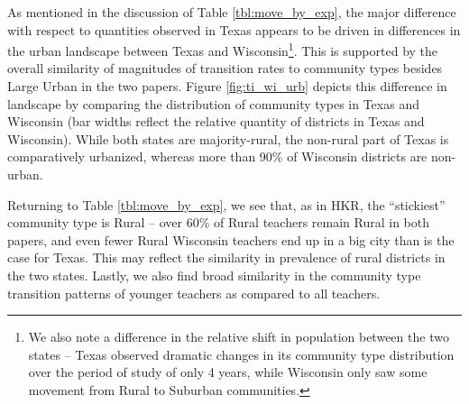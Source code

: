 \documentclass[12pt,]{article}
\let\rmarkdownfootnote\footnote%
\def\footnote{\protect\rmarkdownfootnote}
\begin{document}
As mentioned in the discussion of Table \ref{tbl:move_by_exp}, the major
difference with respect to quantities observed in Texas appears to be
driven in differences in the urban landscape between Texas and
Wisconsin\footnote{We also note a difference in the relative shift in
  population between the two states -- Texas observed dramatic changes
  in its community type distribution over the period of study of only 4
  years, while Wisconsin only saw some movement from Rural to Suburban
  communities.}. This is supported by the overall similarity of
magnitudes of transition rates to community types besides Large Urban in
the two papers. Figure \ref{fig:ti_wi_urb} depicts this difference in
landscape by comparing the distribution of community types in Texas and
Wisconsin (bar widths reflect the relative quantity of districts in
Texas and Wisconsin). While both states are majority-rural, the
non-rural part of Texas is comparatively urbanized, whereas more than
90\% of Wisconsin districts are non-urban.

Returning to Table \ref{tbl:move_by_exp}, we see that, as in HKR, the
``stickiest'' community type is Rural -- over 60\% of Rural teachers
remain Rural in both papers, and even fewer Rural Wisconsin teachers end
up in a big city than is the case for Texas. This may reflect the
similarity in prevalence of rural districts in the two states. Lastly,
we also find broad similarity in the community type transition patterns
of younger teachers as compared to all teachers.
\end{document}
